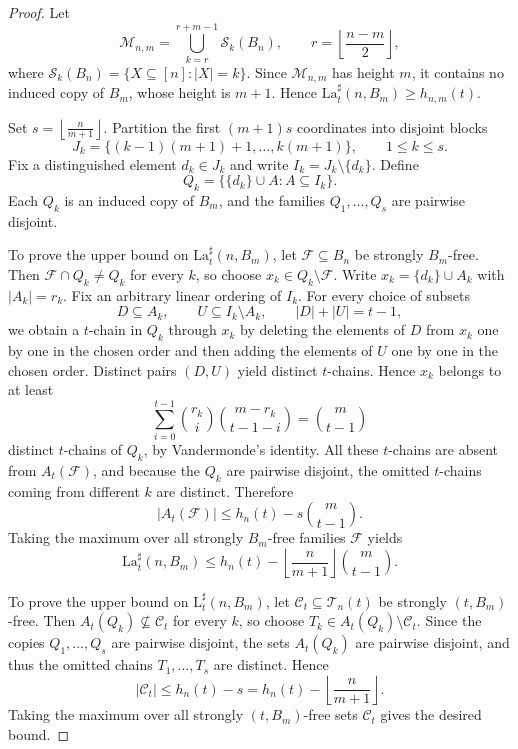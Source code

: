 \documentclass[twoside,12pt]{article}
\newcommand{\flr}[1]{\left\lfloor #1 \right\rfloor}
\newcommand{\floor}[1]{\flr{#1}}
\newcommand{\LaT}{\mathrm{La}}
\newcommand{\LT}{\mathrm{L}}
\begin{document}
\begin{proof}
Let
\[
\mathcal M_{n,m}
=
\bigcup_{k=r}^{r+m-1}\mathcal S_k(B_n),
\qquad
r=\floor{\frac{n-m}{2}},
\]
where \(\mathcal S_k(B_n)=\{X\subseteq[n]:|X|=k\}\). Since \(\mathcal M_{n,m}\) has height \(m\), it contains no induced copy of \(B_m\), whose height is \(m+1\). Hence
$\LaT_t^\sharp(n,B_m)\ge h_{n,m}(t)$.

Set $s=\floor{\frac{n}{m+1}}$.
Partition the first \((m+1)s\) coordinates into disjoint blocks
\[
J_k=\{(k-1)(m+1)+1,\dots,k(m+1)\},
\qquad 1\le k\le s.
\]
Fix a distinguished element \(d_k\in J_k\) and write \(I_k=J_k\setminus\{d_k\}\). Define
\[
Q_k=\bigl\{\{d_k\}\cup A:A\subseteq I_k\bigr\}.
\]
Each \(Q_k\) is an induced copy of \(B_m\), and the families \(Q_1,\dots,Q_s\) are pairwise disjoint.

To prove the upper bound on \(\LaT_t^\sharp(n,B_m)\), let \(\mathcal F\subseteq B_n\) be strongly \(B_m\)-free. Then \(\mathcal F\cap Q_k\neq Q_k\) for every \(k\), so choose \(x_k\in Q_k\setminus \mathcal F\). Write \(x_k=\{d_k\}\cup A_k\) with \(|A_k|=r_k\). Fix an arbitrary linear ordering of \(I_k\). For every choice of subsets
\[
D\subseteq A_k,\qquad U\subseteq I_k\setminus A_k,\qquad |D|+|U|=t-1,
\]
we obtain a \(t\)-chain in \(Q_k\) through \(x_k\) by deleting the elements of \(D\) from \(x_k\) one by one in the chosen order and then adding the elements of \(U\) one by one in the chosen order. Distinct pairs \((D,U)\) yield distinct \(t\)-chains. Hence \(x_k\) belongs to at least
\[
\sum_{i=0}^{t-1}\binom{r_k}{i}\binom{m-r_k}{t-1-i}
=
\binom{m}{t-1}
\]
distinct \(t\)-chains of \(Q_k\), by Vandermonde's identity.
All these \(t\)-chains are absent from \(A_t(\mathcal F)\), and because the \(Q_k\) are pairwise disjoint, the omitted \(t\)-chains coming from different \(k\) are distinct. Therefore
\[
|A_t(\mathcal F)|\le h_n(t)-s\binom{m}{t-1}.
\]
Taking the maximum over all strongly \(B_m\)-free families \(\mathcal F\) yields
\[
\LaT_t^\sharp(n,B_m)\le h_n(t)-\floor{\frac{n}{m+1}}\binom{m}{t-1}.
\]

To prove the upper bound on \(\LT_t^\sharp(n,B_m)\), let \(\mathcal C_t\subseteq \mathcal T_n(t)\) be strongly \((t,B_m)\)-free. Then \(A_t(Q_k)\nsubseteq \mathcal C_t\) for every \(k\), so choose \(T_k\in A_t(Q_k)\setminus \mathcal C_t\). Since the copies \(Q_1,\dots,Q_s\) are pairwise disjoint, the sets \(A_t(Q_k)\) are pairwise disjoint, and thus the omitted chains \(T_1,\dots,T_s\) are distinct. Hence
\[
|\mathcal C_t|\le h_n(t)-s=h_n(t)-\floor{\frac{n}{m+1}}.
\]
Taking the maximum over all strongly \((t,B_m)\)-free sets \(\mathcal C_t\) gives the desired bound.
\end{proof}
\end{document}
